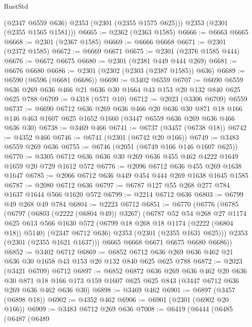 \begin{lexlean}{RustStd}
\begin{coremodule}
{\begin{coremodule}
{{{{{{{{{{{{{        (@2347 @6559 @636)
        @2353
        (@2301 (@2355 @1575 @625)))
      @2353
      (@2301 (@2355 @1565 @1581)))
@6665 := @2362 (@2363 @1585)
@6666 := @6663 @6665
@6668 := @2301 (@2367 @1585)
@6669 := @6666 @6668
@6671 := @2301 (@2372 @1585)
@6672 := @6669 @6671
@6675 := @2301 (@2376 @1585 @444)
@6676 := @6672 @6675
@6680 := @2301 (@2381 @449 @444 @269)
@6681 := @6676 @6680
@6686 := @2301 (@2302 (@2303 (@2387 @1585)) @636)
@6689 := @6590 (@6596 (@6681 @6686))
@6690 := @3402 @6559
@6707 := @6690 @6559 @636 @269 @636 @466 @21 @636 @30 @1664 @43 @153 @20 @132 @840 @625 @625 @788
@6709 := @4318 (@571 @10)
@6712 := @2023 (@3306 @6709) @6559
@6737 := @6690
    @6712
    @636
    @269
    @636
    @466
    @20
    @636
    @30
    @871
    @18
    @166
    @146
    @463
    @1607
    @625
    @1652
    @1660
    (@3447 @6559 @636 @269 @636 @466 @636 @30)
@6738 := @3469 @466
@6741 := @6737 (@3457 (@6738 @18))
@6742 := @4352 @466
@6746 := @6741 (@2301 (@6742 @20 @166))
@6749 := @3483 @6559 @269 @636
@6755 := @6746 (@2051 (@6749 @166 @146 @1607 @625))
@6770 := @3305 @6712 @636 @636 @30 @269 @636 @455 @462 @4222 @1649 @1659 @20 @729 @1612 @572
@6776 := @2096 @6712 @636 @455 @269 @1638 @1647
@6785 := @2066 @6712 @636 @449 @454 @444 @269 @1638 @1645 @1585
@6787 := @2080 @6712 @636
@6797 := @6787 @127 @55 @268 @277 @784 @1637 @1644 @566 @1620 @572
@6799 := @2214 @6712 @636
@6803 := @6799 @49 @268 @49 @784
@6804 := @2223 @6712
@6851 := @6770
    (@6776
      (@6785
        (@6797
          (@6803 (@2222 (@6804 @49)) @3267)
          (@6787
            @52
            @54
            @268
            @27
            @1174
            @625
            @613
            @566
            @1630
            @572
            (@6799 @18 @268 @18 @1174 (@2222 (@6804 @18)) @5140)
            (@2347 @6712 @636)
            @2353
            (@2301 (@2355 @1631 @625)))
          @2353
          (@2301 (@2355 @1621 @1637)))
        @6665
        @6668
        @6671
        @6675
        @6680
        @6686))
@6852 := @3402 @6712
@6869 := @6852 @6712 @636 @269 @636 @462 @21 @636 @30 @1658 @43 @153 @20 @132 @840 @625 @625 @788
@6872 := @2023 (@3421 @6709) @6712
@6897 := @6852
    @6872
    @636
    @269
    @636
    @462
    @20
    @636
    @30
    @871
    @18
    @166
    @173
    @159
    @1607
    @625
    @625
    @843
    (@3447 @6712 @636 @269 @636 @462 @636 @30)
@6898 := @3469 @462
@6901 := @6897 (@3457 (@6898 @18))
@6902 := @4352 @462
@6906 := @6901 (@2301 (@6902 @20 @166))
@6909 := @3483 @6712 @269 @636
@7008 := @6419
    (@6444
      (@6485
        (@6487
          (@6489
}}}}}}}}}}}}}
\end{coremodule}}
\end{coremodule}
\end{lexlean}
